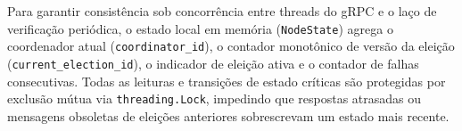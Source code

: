 Para garantir consistência sob concorrência entre threads do gRPC e o laço de verificação periódica, o estado local em memória (\texttt{NodeState}) agrega o coordenador atual (\texttt{coordinator\_id}), o contador monotônico de versão da eleição (\texttt{current\_election\_id}), o indicador de eleição ativa e o contador de falhas consecutivas. Todas as leituras e transições de estado críticas são protegidas por exclusão mútua via \texttt{threading.Lock}, impedindo que respostas atrasadas ou mensagens obsoletas de eleições anteriores sobrescrevam um estado mais recente.
